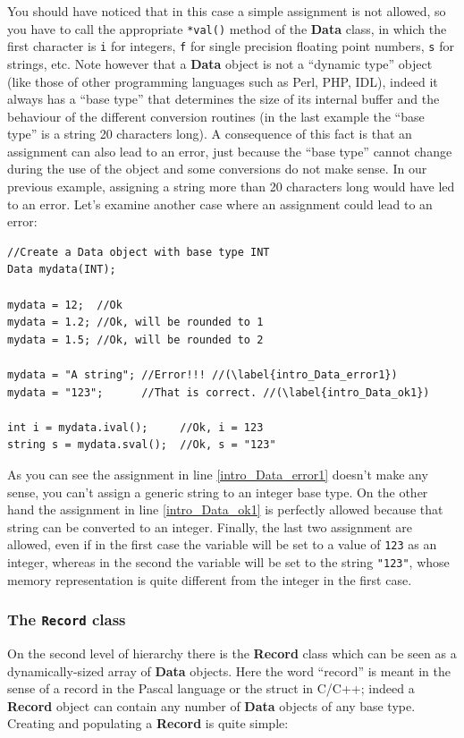 \documentclass[12pt,titlepage]{article}
\begin{document}
\noindent
You should have noticed that in this case a simple assignment is not allowed,
so you have to call the appropriate \verb|*val()| method of the \textbf{Data}
class, in which the first character is \verb|i| for integers, \verb|f| for
single precision floating point numbers, \verb|s| for strings, etc. Note
however that a \textbf{Data} object is not a ``dynamic type'' object (like
those of other programming languages such as Perl, PHP, IDL), indeed it always
has a ``base type'' that determines the size of its internal buffer and the
behaviour of the different conversion routines (in the last example the ``base
type'' is a string 20 characters long). A consequence of this fact is that an
assignment can also lead to an error, just because the ``base type'' cannot
change during the use of the object and some conversions do not make sense. In
our previous example, assigning a string more than 20 characters long would
have led to an error. Let's examine another case where an assignment could
lead to an error:

\begin{lstlisting}
//Create a Data object with base type INT
Data mydata(INT);

mydata = 12;  //Ok
mydata = 1.2; //Ok, will be rounded to 1
mydata = 1.5; //Ok, will be rounded to 2

mydata = "A string"; //Error!!! //(\label{intro_Data_error1})
mydata = "123";      //That is correct. //(\label{intro_Data_ok1})

int i = mydata.ival();     //Ok, i = 123
string s = mydata.sval();  //Ok, s = "123"
\end{lstlisting}

\noindent
As you can see the assignment in line \ref{intro_Data_error1} doesn't
make any sense, you can't assign a generic string to an integer base
type. On the other hand the assignment in line \ref{intro_Data_ok1} is
perfectly allowed because that string can be converted to an integer.
Finally, the last two assignment are allowed, even if in the first
case the variable will be set to a value of \verb|123| as an integer,
whereas in the second the variable will be set to the string
\verb|"123"|, whose memory representation is quite different from the
integer in the first case.

\subsubsection{The \texttt{Record} class}
\label{sec:The Record class}
On the second level of hierarchy there is the \textbf{Record} class
which can be seen as a dynamically-sized array of \textbf{Data}
objects. Here the word ``record'' is meant in the sense of a record in
the Pascal language or the struct in C/C++; indeed a \textbf{Record}
object can contain any number of \textbf{Data} objects of any base
type. Creating and populating a \textbf{Record} is quite simple:
\end{document}
